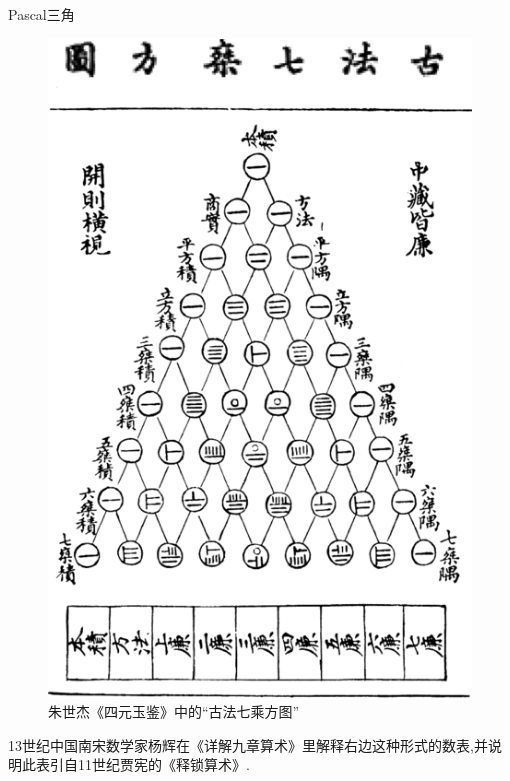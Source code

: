 \documentclass[10pt,punct]{ctexbeamer}
\begin{document}
\begin{frame}
\begin{center}
\begin{minipage}{0.55\linewidth}
\begin{table}[]
\begin{center}
                \end{center}
                \caption{Pascal三角}
            \end{table}
        \end{minipage}
        \hspace*{25pt}
        \begin{minipage}{0.35\linewidth}
            \begin{figure}
                \centering
                \includegraphics[scale=0.21]{yanghui.png}
                \caption{朱世杰《四元玉鉴》中的“古法七乘方图''}
            \end{figure}
        \end{minipage}
    \end{center}






    13世纪中国南宋数学家杨辉在《详解九章算术》里解释右边这种形式的数表,并说明此表引自11世纪贾宪的《释锁算术》.



\end{frame}
\end{document}
